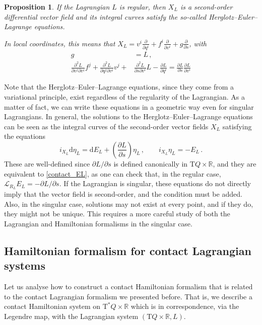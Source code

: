 \documentclass[11pt]{article}
\theoremstyle{plain}
\newtheorem{proposition}[theorem]{Proposition}
\theoremstyle{definition}
\newcommand{\R}{\mathbb{R}}
\renewcommand{\d}{\mathrm{d}}
\newcommand{\T}{{\mathrm T}}
\let\Tan\T
\newcommand{\Lie}{\mathscr{L}}
\newcommand{\parder}[2]{\frac{\partial #1}{\partial #2}}
\newcommand{\tparder}[2]{\partial #1/\partial #2}
\newcommand{\parderr}[3]{\frac{\partial^2 #1}{\partial #2\partial #3}}
\def\d{\mathrm{d}}
\def\d{\mathrm{d}}
\def\Tan{\mathrm{T}}
\def\Lie{\mathscr{L}}
\begin{document}
\begin{proposition}
    If the Lagrangian $L$ is regular, then $X_L$ is a second-order differential vector field and its integral curves satisfy the so-called Herglotz--Euler--Lagrange equations. 

    In local coordinates, this means that 
    $\displaystyle X_L = v^i \frac{\partial}{\partial q^i} + f^i \frac{\partial}{\partial v^i} + g \frac{\partial}{\partial s}$, with 
    \begin{align}
        g&=L\,,
        \\
        \parderr{L}{v^j}{v^i}f^j + \parderr{L}{q^j}{v^i}v^j +&
        \parderr{L}{s}{v^i} L -\parder{L}{q^i}  = \parder{L}{s}\parder{L}{v^i}
    \end{align}
\end{proposition}

Note that the Herglotz--Euler--Lagrange equations, since they come from a variational principle, exist regardless of the regularity of the Lagrangian. As a matter of fact, we can write these equations in a geometric way even for singular Lagrangians. In general, the solutions to the Herglotz--Euler--Lagrange equations can be seen as the integral curves of the second-order vector fields $X_L$ satisfying the equations
\begin{equation}
        i_{X_L} \d \eta_L = \d E_L +\left(\parder{L}{s}\right) \eta_L \,,\qquad
    i_{X_L} \eta_L = - E_L \,.
\end{equation}
These are well-defined since $\tparder{L}{s}$ is defined canonically in $\Tan Q \times \R$, and they are equivalent to \eqref{contact_EL}, as one can check that, in the regular case, $\Lie_{R_L} E_L = -\tparder{L}{s}$. If the Lagrangian is singular, these equations do not directly imply that the vector field is second-order, and the condition must be added. Also, in the singular case, solutions may not exist at every point, and if they do, they might not be unique. This requires a more careful study of both the Lagrangian and Hamiltonian formalisms in the singular case.


\subsection{Hamiltonian formalism for contact Lagrangian systems}

Let us analyse how to construct a contact Hamiltonian formalism that is related to the contact Lagrangian formalism we presented before. That is, we describe a contact Hamiltonian system on $\Tan^*Q \times \R$ which is in correspondence, via the Legendre map, with the Lagrangian system $(\Tan Q \times \R, L)$.
\end{document}
